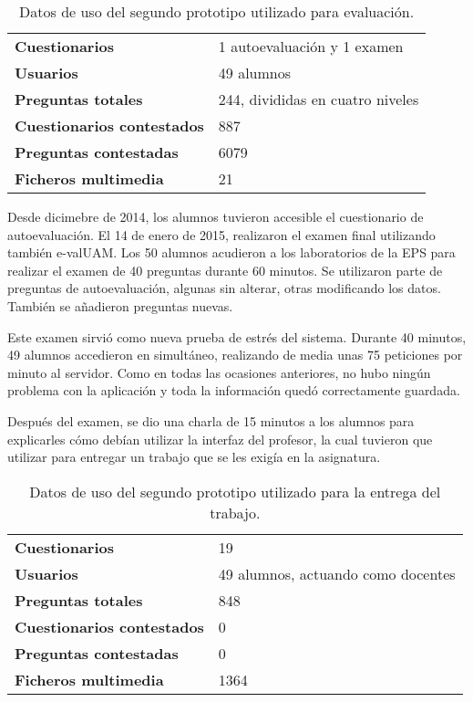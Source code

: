 \begin{table}[hc]
	\centering
	\begin{tabular}{l|l}
		{\bf Cuestionarios}             & 1 autoevaluación y 1 examen \\ 
		{\bf Usuarios}                  & 49 alumnos\\
		{\bf Preguntas totales}         & 244, divididas en cuatro niveles    \\ 
		{\bf Cuestionarios contestados} & 887                              \\ 
		{\bf Preguntas contestadas}     & 6079                             \\ 
		{\bf Ficheros multimedia}		& 21							   \\
	\end{tabular}
	\caption{Datos de uso del segundo prototipo utilizado para evaluaci\'on.}
\end{table}

Desde dicimebre de 2014, los alumnos tuvieron accesible el cuestionario de autoevaluación. El 14 de enero de 2015, realizaron el examen final utilizando también \acrshort{e-valUAM}. Los 50 alumnos acudieron a los laboratorios de la EPS para realizar el examen de 40 preguntas durante 60 minutos. Se utilizaron parte de preguntas de autoevaluación, algunas sin alterar, otras modificando los datos. También se añadieron preguntas nuevas.

Este examen sirvió como nueva prueba de estrés del sistema. Durante 40 minutos, 49 alumnos accedieron en simultáneo, realizando de media unas 75 peticiones por minuto al servidor. Como en todas las ocasiones anteriores, no hubo ningún problema con la aplicación y toda la información quedó correctamente guardada.

Después del examen, se dio una charla de 15 minutos a los alumnos para explicarles cómo debían utilizar la interfaz del profesor, la cual tuvieron que utilizar para entregar un trabajo que se les exigía en la asignatura.

\begin{table}[hc]
	\centering
	\begin{tabular}{l|l}
		{\bf Cuestionarios}             & 19 \\ 
		{\bf Usuarios}                  & 49 alumnos, actuando como docentes\\
		{\bf Preguntas totales}         & 848  \\ 
		{\bf Cuestionarios contestados} & 0                              \\ 
		{\bf Preguntas contestadas}     & 0                             \\ 
		{\bf Ficheros multimedia}		& 1364							   \\
	\end{tabular}
	\caption{Datos de uso del segundo prototipo utilizado para la entrega del trabajo.}
\end{table}

